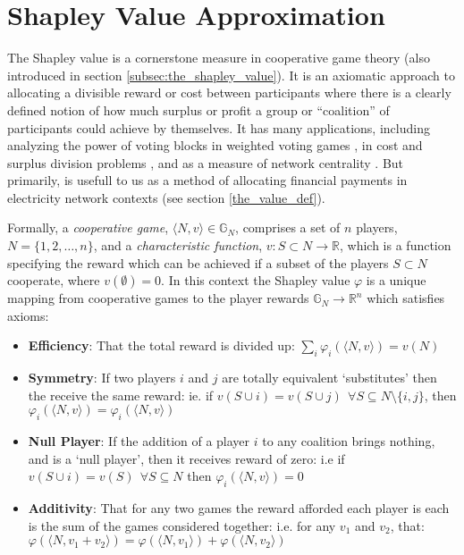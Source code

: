 
\pagebreak
\section{Shapley Value Approximation}\label{sec:shapley}

The Shapley value is a cornerstone measure in cooperative game theory (also introduced in section \ref{subsec:the_shapley_value}). 
It is an axiomatic approach to allocating a divisible reward or cost between participants where there is a clearly defined notion of how much surplus or profit a group or ``coalition'' of participants could achieve by themselves.
It has many applications, 
including analyzing the power of voting blocks in weighted voting games \citep{Bachrach2009ApproximatingPI}, 
in cost and surplus division problems  \citep{AzizEtal2016,archie_paper1}, 
and as a measure of network centrality \citep{Michalak:2013}.
But primarily, is usefull to us as a method of allocating financial payments in electricity network contexts (see section \ref{the_value_def}).

Formally, a \textit{cooperative game}, $\langle N,v\rangle\in\mathbb{G}_N$, comprises a set of $n$ players, $N=\{1,2,\dots,n\}$, and a \textit{characteristic function}, $v:S\subset N\rightarrow \mathbb{R}$, which is a function specifying the reward which can be achieved if a subset of the players $S\subset N$ cooperate, where $v(\emptyset)=0$.
In this context the Shapley value $\varphi$ is a unique mapping from cooperative games to the player rewards $\mathbb{G}_N\rightarrow\mathbb{R}^n$ which satisfies axioms:

\begin{itemize}
\item	
\textbf{Efficiency}: That the total reward is divided up: $\sum_i\varphi_i(\langle N,v\rangle) = v(N)$
\item	
\textbf{Symmetry}: If two players $i$ and $j$ are totally equivalent `substitutes' then the receive the same reward: ie. if $v(S\cup i)=v(S\cup j)~~\forall S\subseteq N\setminus\{i,j\}$, then $\varphi_i(\langle N,v\rangle) = \varphi_i(\langle N,v\rangle)$
\item	
\textbf{Null Player}: If the addition of a player $i$ to any coalition brings nothing, and is a `null player', then it receives reward of zero: i.e if $v(S\cup i)=v(S)~~\forall S\subseteq N$ then $\varphi_i(\langle N,v\rangle)=0$
\item	
\textbf{Additivity}: That for any two games the reward afforded each player is each is the sum of the games considered together: i.e. for any $v_1$ and $v_2$, that: $\varphi(\langle N,v_1+v_2\rangle)=\varphi(\langle N,v_1 \rangle) + \varphi(\langle N,v_2\rangle)$
\end{itemize}

